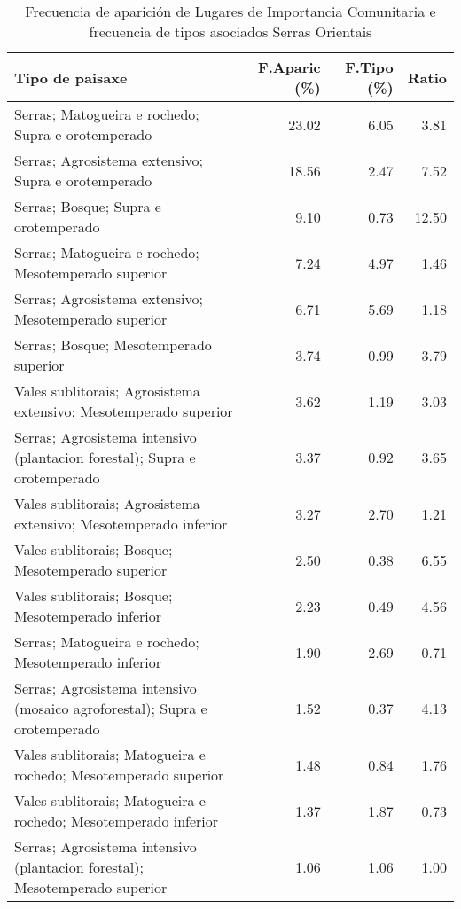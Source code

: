 \begin{table}[p]
\centering
\caption{Frecuencia de aparición de Lugares de Importancia Comunitaria e frecuencia de tipos asociados Serras Orientais} 
\label{vnatura5}
\begin{tabular}{lrrr}
  \hline
Tipo de paisaxe & F.Aparic (\%) & F.Tipo (\%) & Ratio \\ 
  \hline
Serras; Matogueira e rochedo; Supra e orotemperado & 23.02 & 6.05 & 3.81 \\ 
  Serras; Agrosistema extensivo; Supra e orotemperado & 18.56 & 2.47 & 7.52 \\ 
  Serras; Bosque; Supra e orotemperado & 9.10 & 0.73 & 12.50 \\ 
  Serras; Matogueira e rochedo; Mesotemperado superior & 7.24 & 4.97 & 1.46 \\ 
  Serras; Agrosistema extensivo; Mesotemperado superior & 6.71 & 5.69 & 1.18 \\ 
  Serras; Bosque; Mesotemperado superior & 3.74 & 0.99 & 3.79 \\ 
  Vales sublitorais; Agrosistema extensivo; Mesotemperado superior & 3.62 & 1.19 & 3.03 \\ 
  Serras; Agrosistema intensivo (plantacion forestal); Supra e orotemperado & 3.37 & 0.92 & 3.65 \\ 
  Vales sublitorais; Agrosistema extensivo; Mesotemperado inferior & 3.27 & 2.70 & 1.21 \\ 
  Vales sublitorais; Bosque; Mesotemperado superior & 2.50 & 0.38 & 6.55 \\ 
  Vales sublitorais; Bosque; Mesotemperado inferior & 2.23 & 0.49 & 4.56 \\ 
  Serras; Matogueira e rochedo; Mesotemperado inferior & 1.90 & 2.69 & 0.71 \\ 
  Serras; Agrosistema intensivo (mosaico agroforestal); Supra e orotemperado & 1.52 & 0.37 & 4.13 \\ 
  Vales sublitorais; Matogueira e rochedo; Mesotemperado superior & 1.48 & 0.84 & 1.76 \\ 
  Vales sublitorais; Matogueira e rochedo; Mesotemperado inferior & 1.37 & 1.87 & 0.73 \\ 
  Serras; Agrosistema intensivo (plantacion forestal); Mesotemperado superior & 1.06 & 1.06 & 1.00 \\ 
   \hline
\end{tabular}
\end{table}
